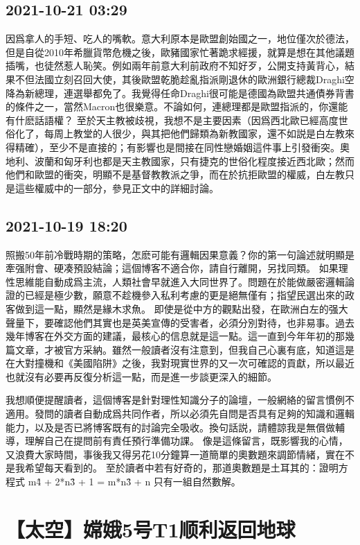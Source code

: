 \documentclass[twocolumn]{ctexart}
\begin{document}
\subsection*{2021-10-21 03:29}

因爲拿人的手短、吃人的嘴軟。意大利原本是歐盟創始國之一，地位僅次於德法，但是自從2010年希臘貨幣危機之後，歐豬國家忙著跪求經援，就算是想在其他議題插嘴，也徒然惹人恥笑。例如兩年前意大利前政府不知好歹，公開支持黃背心，結果不但法國立刻召回大使，其後歐盟乾脆趁亂指派剛退休的歐洲銀行總裁Draghi空降為新總理，連選舉都免了。我覺得任命Draghi很可能是德國為歐盟共通債券背書的條件之一，當然Macron也很樂意。不論如何，連總理都是歐盟指派的，你還能有什麽話語權？
至於天主教被歧視，我想不是主要因素（因爲西北歐已經高度世俗化了，每周上教堂的人很少，與其把他們歸類為新教國家，還不如説是白左教來得精確），至少不是直接的；有影響也是間接在同性戀婚姻這件事上引發衝突。奧地利、波蘭和匈牙利也都是天主教國家，只有捷克的世俗化程度接近西北歐；然而他們和歐盟的衝突，明顯不是基督教教派之爭，而在於抗拒歐盟的權威，白左教只是這些權威中的一部分，參見正文中的詳細討論。
\subsection*{2021-10-19 18:20}

照搬50年前冷戰時期的策略，怎麽可能有邏輯因果意義？你的第一句論述就明顯是牽强附會、硬凑預設結論；這個博客不適合你，請自行離開，另找同類。
如果理性思維能自動成爲主流，人類社會早就進入大同世界了。問題在於能做嚴密邏輯論證的已經是極少數，願意不趁機參入私利考慮的更是絕無僅有；指望民選出來的政客做到這一點，顯然是緣木求魚。
即使是從中方的觀點出發，在歐洲白左的强大聲量下，要確認他們其實也是英美宣傳的受害者，必須分別對待，也非易事。過去幾年博客在外交方面的建議，最核心的信息就是這一點。這一直到今年年初的那幾篇文章，才被官方采納。雖然一般讀者沒有注意到，但我自己心裏有底，知道這是在大對撞機和《美國陷阱》之後，我對現實世界的又一次可確認的貢獻，所以最近也就沒有必要再反復分析這一點，而是進一步談更深入的細節。

我想順便提醒讀者，這個博客是針對理性知識分子的論壇，一般網絡的留言慣例不適用。發問的讀者自動成爲共同作者，所以必須先自問是否具有足夠的知識和邏輯能力，以及是否已將博客既有的討論完全吸收。換句話説，請體諒我是無償做輔導，理解自己在提問前有責任預行準備功課。
像是這條留言，既影響我的心情，又浪費大家時間，事後我又得另花10分鐘算一道簡單的奧數題來調節情緒，實在不是我希望每天看到的。
至於讀者中若有好奇的，那道奧數題是土耳其的：證明方程式 m\^4 + 2*n\^3 + 1 = m*n\^3 + n 只有一組自然數解。
\section*{【太空】嫦娥5号T1顺利返回地球}
\end{document}
